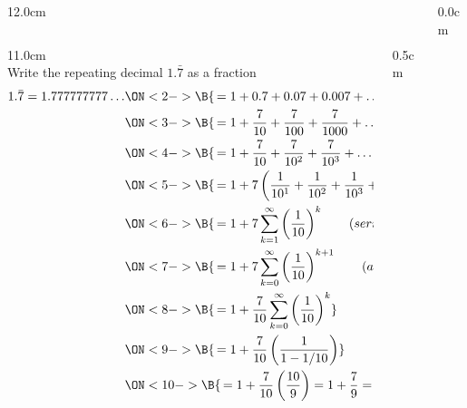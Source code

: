 \begin{frame}
\frametitle{}
\scriptsize
\begin{columns}
\begin{column}{12.0cm}

\vspace{0.2cm}

\begin{columns}
\begin{column}{11.0cm}
\\

Write the repeating decimal $1.\bar{7}$ as a fraction\\

\begin{align*}
	1.\bar{7} = 1.777777777\dots & \ON<2->{\B{\, = 1 + 0.7 + 0.07 + 0.007 + \dots}} \\
					            & \ON<3->{\B{\, = 1 + \frac{7}{10} + \frac{7}{100} + \frac{7}{1000} + \dots}} \\
					            & \ON<4->{\B{\, = 1 + \frac{7}{10} + \frac{7}{10^2} + \frac{7}{10^3} + \dots}} \\
					            & \ON<5->{\B{\, = 1 + 7\left(\frac{1}{10^1} + \frac{1}{10^2} + \frac{1}{10^3} + \dots\right)}} \\
					            & \ON<6->{\B{\, = 1 + 7\sum \limits_{k=1}^{\infty} \left(\frac{1}{10}\right)^k \qquad (series \, converges)}}\\
					            & \ON<7->{\B{\, = 1 + 7\sum \limits_{k=0}^{\infty} \left(\frac{1}{10}\right)^{k+1} \qquad (adjust \, index)}}\\
					            & \ON<8->{\B{\, = 1 + \frac{7}{10}\sum \limits_{k=0}^{\infty} \left(\frac{1}{10}\right)^{k}}}\\
					            & \ON<9->{\B{\, = 1 + \frac{7}{10} \left(\frac{1}{1-1/10}\right)}}\\
					            & \ON<10->{\B{\, = 1 + \frac{7}{10} \left(\frac{10}{9}\right) = 1 + \frac{7}{9} =  \frac{16}{9}}}\\
\end{align*}

\vspace{10.5cm}

\end{column}
\begin{column}{0.5cm}
	
\end{column}
\end{columns}
\end{column}
\begin{column}{0.0cm}\end{column}
\end{columns}
\end{frame}

